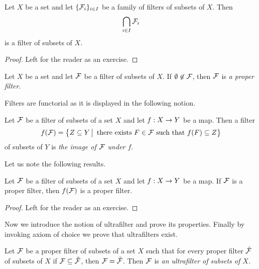 \begin{fact}\label{fact:filters_are_closed_under_intersections}
Let $X$ be a set and let $\{{\mathcal F}_i\}_{i\in I}$ be a family of filters of subsets of $X$. Then 
$$\bigcap_{i\in I}{\mathcal F}_i$$
is a filter of subsets of $X$.
\end{fact}
\begin{proof}
Left for the reader as an exercise.
\end{proof}

\begin{definition}
Let $X$ be a set and let ${\mathcal F}$ be a filter of subsets of $X$. If $\emptyset \not \in {\mathcal F}$, then ${\mathcal F}$ is \textit{a proper filter}.
\end{definition}
\noindent
Filters are functorial as it is displayed in the following notion. 

\begin{definition}
Let ${\mathcal F}$ be a filter of subsets of a set $X$ and let $f:X\rightarrow Y$ be a map. Then a filter
$$f({\mathcal F}) = \big\{Z \subseteq Y\,\big|\,\mbox{ there exists }F\in {\mathcal F}\mbox{ such that }f(F)\subseteq Z\big\}$$
of subsets of $Y$ is \textit{the image of ${\mathcal F}$ under $f$}.
\end{definition}
\noindent
Let us note the following results.

\begin{fact}\label{fact:image_of_a_proper_filter_is_proper}
Let ${\mathcal F}$ be a filter of subsets of a set $X$ and let $f:X\rightarrow Y$ be a map. If ${\mathcal F}$ is a proper filter, then $f({\mathcal F})$ is a proper filter.
\end{fact}
\begin{proof}
Left for the reader as an exercise.
\end{proof}
\noindent
Now we introduce the notion of ultrafilter and prove its properties. Finally by invoking axiom of choice we prove that ultrafilters exist.

\begin{definition}
Let ${\mathcal F}$ be a proper filter of subsets of a set $X$ such that for every proper filter $\tilde{{\mathcal F}}$ of subsets of $X$ if ${\mathcal F} \subseteq \tilde{{\mathcal F}}$, then ${\mathcal F} = \tilde{{\mathcal F}}$. Then ${\mathcal F}$ is \textit{an ultrafilter of subsets of $X$}.
\end{definition}

